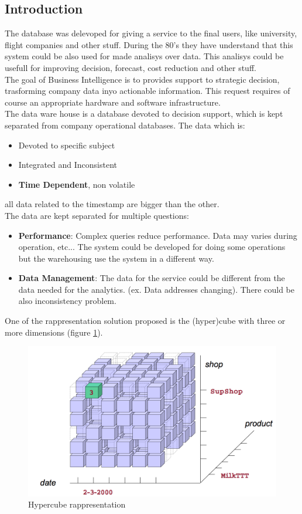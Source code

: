 \documentclass[12pt]{article}
\begin{document}
\subsection{Introduction}
The database was delevoped for giving a service to the final users, like university, flight companies and other stuff. During the 80's they have understand that this system could be also used for made analisys over data. This analisys could be usefull for improving decision, forecast, cost reduction and other stuff.\\
The goal of Business Intelligence is to provides support to strategic decision, trasforming company data inyo actionable information. This request requires of course an appropriate hardware and software infrastructure.\\
The data ware house is a database devoted to decision support, which is kept separated from company operational databases. The data which is:
\begin{itemize}
  \item Devoted to specific subject
  \item Integrated and Inconsistent
  \item \textbf{Time Dependent}, non volatile
\end{itemize}
all data related to the timestamp are bigger than the other.\\
The data are kept separated for multiple questions:
\begin{itemize}
  \item \textbf{Performance}: Complex queries reduce performance. Data may varies during operation, etc... The system could be developed for doing some operations but the warehousing use the system in a different way.
  \item \textbf{Data Management}: The data for the service could be different from the data needed for the analytics. (ex. Data addresses changing). There could be also inconsistency problem.
\end{itemize}
One of the rappresentation solution proposed is the (hyper)cube with three or more dimensions (figure \ref{fig:hypercube}).
\begin{figure}[h!]
  \includegraphics[width=\linewidth]{images/hypercube.png}
  \caption{Hypercube rappresentation}
  \label{fig:hypercube}
\end{figure}
\end{document}
